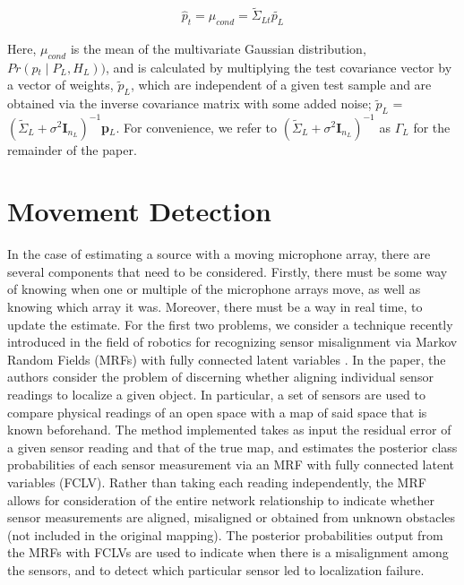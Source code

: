 \documentclass{article}
\begin{document}
\begin{equation}\label{test_est}
    \begin{aligned}
        \textit{$\hat{p}_t$} = \mu_{cond} = \textit{$\tilde{\Sigma}_{Lt}$}\textbf{$\tilde{p_L}$}
    \end{aligned}
\end{equation}

Here, $\mu_{cond}$ is the mean of the multivariate Gaussian distribution,\\ $\textit{Pr}\left(\textit{p$_t$}\mid\textit{P$_L$},\textit{H$_L$}\right))$, and is calculated by multiplying the test covariance vector by a vector of weights, \textbf{$\tilde{p}_L$}, which are independent of a given test sample and are obtained via the inverse covariance matrix with some added noise; \textbf{$\tilde{p}_L$} = $\left(\textit{$\tilde{\Sigma}_L$} + \textit{$\sigma^2$}\textbf{I}_{\textit{n$_L$}}\right)^{-1}$\textbf{p}$_L$. For convenience, we refer to $\left(\textit{$\tilde{\Sigma}_L$} + \textit{$\sigma^2$}\textbf{I}_{\textit{n$_L$}}\right)^{-1}$ as $\Gamma_L$ for the remainder of the paper.


\section{Movement Detection}
In the case of estimating a source with a moving microphone array, there are several components that need to be considered. Firstly, there must be some way of knowing when one or multiple of the microphone arrays move, as well as knowing which array it was. Moreover, there must be a way in real time, to update the estimate. For the first two problems, we consider a technique recently introduced in the field of robotics for recognizing sensor misalignment via Markov Random Fields (MRFs) with fully connected latent variables \cite{NA_misalignmentRecMRFsFcn}. In the paper, the authors consider the problem of discerning whether aligning individual sensor readings to localize a given object. In particular, a set of sensors are used to compare physical readings of an open space with a map of said space that is known beforehand. The method implemented takes as input the residual error of a given sensor reading and that of the true map, and estimates the posterior class probabilities of each sensor measurement via an MRF with fully connected latent variables (FCLV). Rather than taking each reading independently, the MRF allows for consideration of the entire network relationship to indicate whether sensor measurements are aligned, misaligned or obtained from unknown obstacles (not included in the original mapping). The posterior probabilities output from the MRFs with FCLVs are used to indicate when there is a misalignment among the sensors, and to detect which particular sensor led to localization failure.
\end{document}
